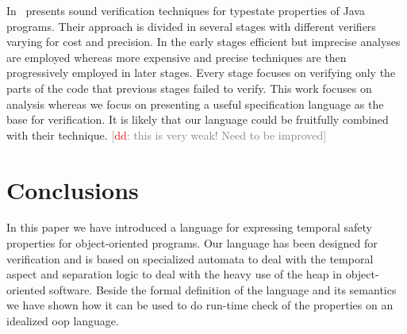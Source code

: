 \documentclass[preprint]{sigplanconf} %
\newcommand{\note}[2]{\textcolor{gray}{[\textcolor{red}{#1}: #2]}}
\newcommand{\dd}[1]{\note{dd}{#1}}
\newcommand{\dinocomment}[1]{\dd{#1}}
\theoremstyle{definition}
\begin{document}
In~\cite{FinkelEtAl} presents sound verification techniques for typestate properties of Java  programs.
Their approach is divided in several stages with different verifiers varying for cost and precision.
In the early stages efficient but imprecise analyses are employed whereas 
more expensive and precise techniques are then progressively employed in later stages.
Every stage focuses on verifying only the parts of the code that previous stages failed to verify.
This work focuses on analysis whereas we focus on presenting a useful specification language as the base for verification.
It is likely that our language could be fruitfully combined with their technique.
\dinocomment{this is very weak! Need to be improved} 

\section{Conclusions}\label{sec:conclusions} %
In this paper we have introduced a language for expressing temporal safety properties for object-oriented programs.
Our language has been designed for verification and is based on specialized automata to deal with the temporal aspect and separation logic to deal with the  heavy use of the heap in object-oriented software. 
Beside the formal definition of the language and its semantics we have shown how it can be used to do run-time check of the properties 
on an idealized oop language.



\softraggedright


\end{document}
